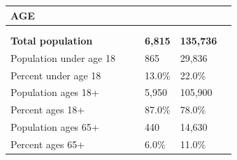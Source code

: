 \documentclass[9pt]{report}
\begin{document}
\vspace{24pt}
\setlength{\tabcolsep}{.01in} %
\begin{tabular}{p{.10in}p{.10in}p{.10in}p{3.7in}>{\hfill}p{.85in}>{\hfill}p{.85in}>{\hfill}p{.85in}>{\hfill}p{.85in}p{0.1in}}
\multicolumn{9}{l}{\parbox{7.1in}{\raggedright{\large{\strut\textbf{AGE}\strut}}}} \\ 
\hline
\multicolumn{4}{l}{\parbox{3.5in}{\raggedright{\textbf{}}}} & \multicolumn{1}{r}{\parbox{.85in}{\strut\raggedleft{\textbf{}\strut}}} & \multicolumn{1}{r}{\parbox{.85in}{\strut\raggedleft{\textbf{}\strut}}} & \multicolumn{1}{r}{\parbox{.85in}{\strut{}}} & \multicolumn{1}{r}{\parbox{.85in}{\strut{}}} & \\ 
\multicolumn{9}{l}{} \\ 
\multicolumn{4}{l}{\parbox{3.5in}{\strut\raggedright{\textbf{Total population}\strut}}} & \textbf{} & \textbf{} & \textbf{6,815} & \textbf{135,736} & \textbf{} \\ 
\multicolumn{4}{l}{\parbox{3.6in}{\strut\raggedright{{Population under age 18}}\strut}} &  &  & 865 & 29,836 & \multicolumn{1}{l}{}  \\ 
\multicolumn{4}{l}{\parbox{3.6in}{\strut\raggedright{{Percent under age 18}}\strut}} &  &  & 13.0\% & 22.0\% & \multicolumn{1}{l}{}  \\ 
\multicolumn{4}{l}{\parbox{3.6in}{\strut\raggedright{{Population ages 18+}}\strut}} &  &  & 5,950 & 105,900 & \multicolumn{1}{l}{}  \\ 
\multicolumn{4}{l}{\parbox{3.6in}{\strut\raggedright{{Percent ages 18+}}\strut}} &  &  & 87.0\% & 78.0\% & \multicolumn{1}{l}{}  \\ 
\multicolumn{4}{l}{\parbox{3.6in}{\strut\raggedright{{Population ages 65+}}\strut}} &  &  & 440 & 14,630 & \multicolumn{1}{l}{}  \\ 
\multicolumn{4}{l}{\parbox{3.6in}{\strut\raggedright{{Percent ages 65+}}\strut}} &  &  & 6.0\% & 11.0\% & \multicolumn{1}{l}{}  \\ 

\end{tabular}
\setlength{\tabcolsep}{6pt} %
\end{document}
